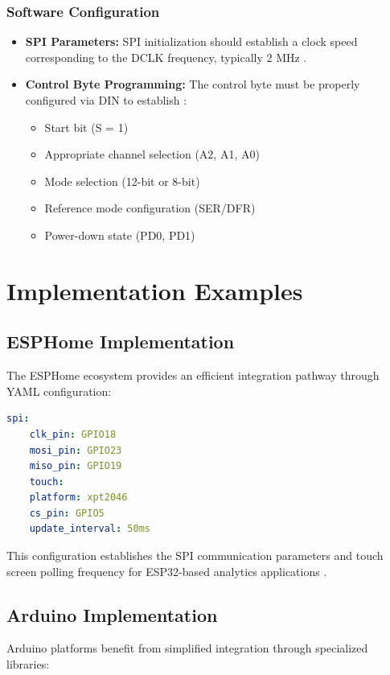 \subsubsection{Software Configuration}
\begin{itemize}
	\item \textbf{SPI Parameters:} SPI initialization should establish a clock speed corresponding to the DCLK frequency, typically 2 MHz \cite{xpt2046:2007}.
	
	\item \textbf{Control Byte Programming:} The control byte must be properly configured via DIN to establish \cite{xpt2046:2007}:
	\begin{itemize}
		\item Start bit (S = 1)
		\item Appropriate channel selection (A2, A1, A0)
		\item Mode selection (12-bit or 8-bit)
		\item Reference mode configuration (SER/DFR)
		\item Power-down state (PD0, PD1)
	\end{itemize}
\end{itemize}

\section{Implementation Examples}
\subsection{ESPHome Implementation}
The ESPHome ecosystem provides an efficient integration pathway through YAML configuration:

\begin{lstlisting}[language=yaml]
	spi:
	clk_pin: GPIO18
	mosi_pin: GPIO23
	miso_pin: GPIO19
	touch:
	platform: xpt2046
	cs_pin: GPIO5
	update_interval: 50ms
\end{lstlisting}

This configuration establishes the SPI communication parameters and touch screen polling frequency for ESP32-based analytics applications \cite{ESPHome:2024}.

\subsection{Arduino Implementation}
Arduino platforms benefit from simplified integration through specialized libraries:

